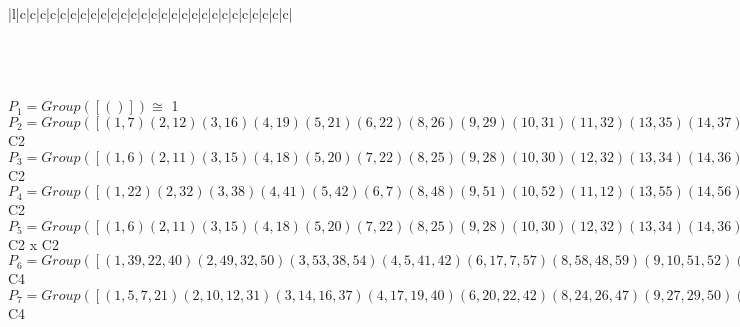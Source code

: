\documentclass[varwidth=\maxdimen,border=10]{standalone}
\begin{document}
\begin{tabular}
\begin{array}{|l|c|c|c|c|c|c|c|c|c|c|c|c|c|c|c|c|c|c|c|c|c|c|c|c|c|c|c|}
\end{array}\)\\
\ \\
\ \\
$P_{1} = Group( [ () ] )\cong$ 1\ \\
$P_{2} = Group( [ ( 1, 7)( 2,12)( 3,16)( 4,19)( 5,21)( 6,22)( 8,26)( 9,29)(10,31)(11,32)(13,35)(14,37)(15,38)(17,40)(18,41)(20,42)(23,45)(24,47)(25,48)(27,50)(28,51)(30,52)(33,54)(34,55)(36,56)(39,57)(43,59)(44,60)(46,61)(49,62)(53,63)(58,64) ] )\cong$ C2\ \\
$P_{3} = Group( [ ( 1, 6)( 2,11)( 3,15)( 4,18)( 5,20)( 7,22)( 8,25)( 9,28)(10,30)(12,32)(13,34)(14,36)(16,38)(17,39)(19,41)(21,42)(23,44)(24,46)(26,48)(27,49)(29,51)(31,52)(33,53)(35,55)(37,56)(40,57)(43,58)(45,60)(47,61)(50,62)(54,63)(59,64) ] )\cong$ C2\ \\
$P_{4} = Group( [ ( 1,22)( 2,32)( 3,38)( 4,41)( 5,42)( 6, 7)( 8,48)( 9,51)(10,52)(11,12)(13,55)(14,56)(15,16)(17,57)(18,19)(20,21)(23,60)(24,61)(25,26)(27,62)(28,29)(30,31)(33,63)(34,35)(36,37)(39,40)(43,64)(44,45)(46,47)(49,50)(53,54)(58,59) ] )\cong$ C2\ \\
$P_{5} = Group( [ ( 1, 6)( 2,11)( 3,15)( 4,18)( 5,20)( 7,22)( 8,25)( 9,28)(10,30)(12,32)(13,34)(14,36)(16,38)(17,39)(19,41)(21,42)(23,44)(24,46)(26,48)(27,49)(29,51)(31,52)(33,53)(35,55)(37,56)(40,57)(43,58)(45,60)(47,61)(50,62)(54,63)(59,64), ( 1, 7)( 2,12)( 3,16)( 4,19)( 5,21)( 6,22)( 8,26)( 9,29)(10,31)(11,32)(13,35)(14,37)(15,38)(17,40)(18,41)(20,42)(23,45)(24,47)(25,48)(27,50)(28,51)(30,52)(33,54)(34,55)(36,56)(39,57)(43,59)(44,60)(46,61)(49,62)(53,63)(58,64) ] )\cong$ C2 x C2\ \\
$P_{6} = Group( [ ( 1,39,22,40)( 2,49,32,50)( 3,53,38,54)( 4, 5,41,42)( 6,17, 7,57)( 8,58,48,59)( 9,10,51,52)(11,27,12,62)(13,14,55,56)(15,33,16,63)(18,20,19,21)(23,24,60,61)(25,43,26,64)(28,30,29,31)(34,36,35,37)(44,46,45,47), ( 1,22)( 2,32)( 3,38)( 4,41)( 5,42)( 6, 7)( 8,48)( 9,51)(10,52)(11,12)(13,55)(14,56)(15,16)(17,57)(18,19)(20,21)(23,60)(24,61)(25,26)(27,62)(28,29)(30,31)(33,63)(34,35)(36,37)(39,40)(43,64)(44,45)(46,47)(49,50)(53,54)(58,59) ] )\cong$ C4\ \\
$P_{7} = Group( [ ( 1, 5, 7,21)( 2,10,12,31)( 3,14,16,37)( 4,17,19,40)( 6,20,22,42)( 8,24,26,47)( 9,27,29,50)(11,30,32,52)(13,33,35,54)(15,36,38,56)(18,39,41,57)(23,43,45,59)(25,46,48,61)(28,49,51,62)(34,53,55,63)(44,58,60,64), ( 1, 7)( 2,12)( 3,16)( 4,19)( 5,21)( 6,22)( 8,26)( 9,29)(10,31)(11,32)(13,35)(14,37)(15,38)(17,40)(18,41)(20,42)(23,45)(24,47)(25,48)(27,50)(28,51)(30,52)(33,54)(34,55)(36,56)(39,57)(43,59)(44,60)(46,61)(49,62)(53,63)(58,64) ] )\cong$ C4\ \\

\end{tabular}
\end{document}
